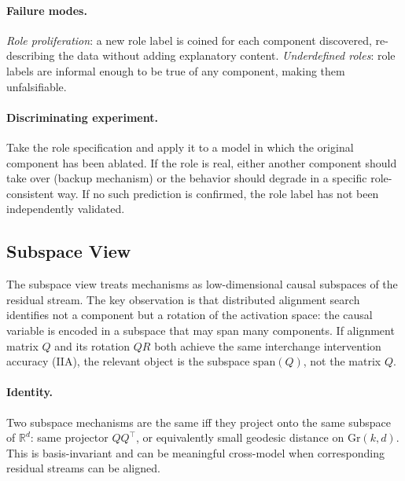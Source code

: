 \documentclass[11pt]{article}
\theoremstyle{remark}
\newcommand{\Gr}{\mathrm{Gr}}
\begin{document}
\paragraph{Failure modes.}
\emph{Role proliferation}: a new role label is coined for each component
discovered, re-describing the data without adding explanatory content.
\emph{Underdefined roles}: role labels are informal enough to be true of
any component, making them unfalsifiable.

\paragraph{Discriminating experiment.}
Take the role specification and apply it to a model in which the
original component has been ablated.  If the role is real, either another
component should take over (backup mechanism) or the behavior should
degrade in a specific role-consistent way.  If no such prediction is
confirmed, the role label has not been independently validated.

\subsection{Subspace View}

The subspace view treats mechanisms as low-dimensional causal subspaces
of the residual stream.  The key observation is that distributed
alignment search \citep{geiger2021,geiger2024} identifies not a component
but a rotation of the activation space: the causal variable is encoded
in a subspace that may span many components.  If alignment matrix $Q$
and its rotation $QR$ both achieve the same interchange intervention
accuracy (IIA), the relevant object is the subspace $\mathrm{span}(Q)$,
not the matrix $Q$.

\paragraph{Identity.}
Two subspace mechanisms are the same iff they project onto the same
subspace of $\mathbb{R}^d$: same projector $QQ^\top$, or equivalently
small geodesic distance on $\Gr(k,d)$.  This is basis-invariant and
can be meaningful cross-model when corresponding residual streams can
be aligned.
\end{document}
